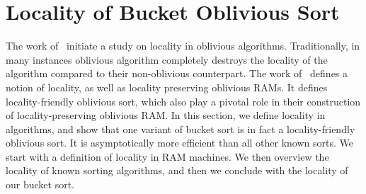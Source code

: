 \section{Locality of Bucket Oblivious Sort}
\label{sec:locality}

The work of~\cite{AsharovCNPRS19} initiate a study on locality in oblivious algorithms. Traditionally, in many instances oblivious algorithm completely destroys the locality of the algorithm compared to their non-oblivious counterpart. The work of~\cite{AsharovCNPRS19} defines a notion of locality, as well as locality preserving oblivious RAMs. It defines locality-friendly oblivious sort, which also play a pivotal role in their construction of locality-preserving oblivious RAM. In this section, we define locality in algorithms, and show that one variant of bucket sort is in fact a locality-friendly oblivious sort. It is asymptotically more efficient than all other known sorts. We start with a definition of locality in RAM machines. We then overview the locality of known sorting algorithms, and then we conclude with the locality of our bucket sort. 





